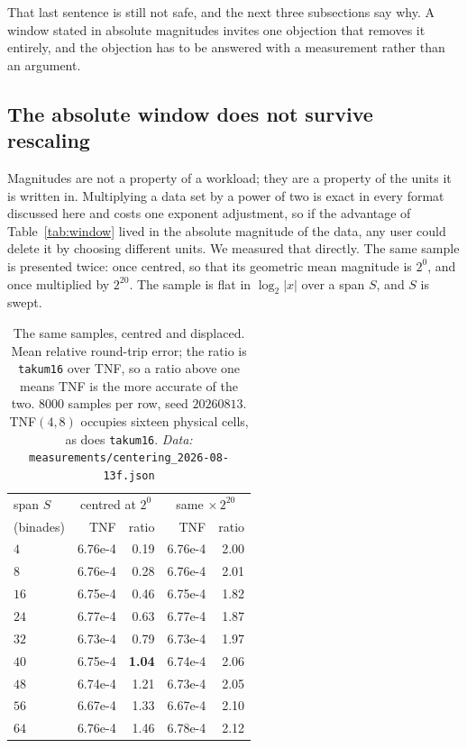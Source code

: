 \documentclass[11pt]{article}
\theoremstyle{definition}
\begin{document}
That last sentence is still not safe, and the next three subsections say why. A
window stated in absolute magnitudes invites one objection that removes it
entirely, and the objection has to be answered with a measurement rather than an
argument.

\subsection{The absolute window does not survive rescaling}
\label{sec:centring}

Magnitudes are not a property of a workload; they are a property of the units it
is written in. Multiplying a data set by a power of two is exact in every format
discussed here and costs one exponent adjustment, so if the advantage of
Table~\ref{tab:window} lived in the absolute magnitude of the data, any user could
delete it by choosing different units. We measured that directly. The same sample
is presented twice: once centred, so that its geometric mean magnitude is $2^0$,
and once multiplied by $2^{20}$. The sample is flat in $\log_2|x|$ over a span
$S$, and $S$ is swept.

\begin{table}[htbp]\centering
\caption{The same samples, centred and displaced. Mean relative round-trip error;
the ratio is \texttt{takum16} over TNF, so a ratio above one means TNF is the more
accurate of the two. $8000$ samples per row, seed $20260813$. TNF$(4,8)$ occupies
sixteen physical cells, as does \texttt{takum16}. \emph{Data:} \texttt{measurements/centering\_2026-08-13f.json}}
\label{tab:centring}
\begin{tabular}{lrrrr}
\hline
span $S$ & \multicolumn{2}{c}{centred at $2^0$} & \multicolumn{2}{c}{same $\times\,2^{20}$} \\
(binades) & TNF & ratio & TNF & ratio \\
\hline
$4$ & 6.76e-4 & 0.19 & 6.76e-4 & 2.00 \\
$8$ & 6.76e-4 & 0.28 & 6.76e-4 & 2.01 \\
$16$ & 6.75e-4 & 0.46 & 6.75e-4 & 1.82 \\
$24$ & 6.77e-4 & 0.63 & 6.77e-4 & 1.87 \\
$32$ & 6.73e-4 & 0.79 & 6.73e-4 & 1.97 \\
$40$ & 6.75e-4 & \textbf{1.04} & 6.74e-4 & 2.06 \\
$48$ & 6.74e-4 & 1.21 & 6.73e-4 & 2.05 \\
$56$ & 6.67e-4 & 1.33 & 6.67e-4 & 2.10 \\
$64$ & 6.76e-4 & 1.46 & 6.78e-4 & 2.12 \\
\hline
\end{tabular}
\end{table}
\end{document}
